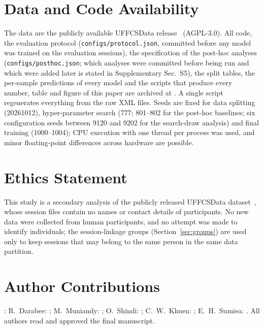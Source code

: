 \section*{Data and Code Availability}
The data are the publicly available UFFCSData release~\cite{porcino2019uffcsdata} (AGPL-3.0). All code, the evaluation protocol (\texttt{configs/\allowbreak protocol.json}, committed before any model was trained on the evaluation sessions), the specification of the post-hoc analyses (\texttt{configs/\allowbreak posthoc.json}; which analyses were committed before being run and which were added later is stated in Supplementary Sec.~S5), the split tables, the per-sample predictions of every model and the scripts that produce every number, table and figure of this paper are archived at . A single script regenerates everything from the raw XML files. Seeds are fixed for data splitting (20261012), hyper-parameter search (777; 801--802 for the post-hoc baselines; six configuration seeds between 9120 and 9202 for the search-draw analysis) and final training (1000--1004); CPU execution with one thread per process was used, and minor floating-point differences across hardware are possible.

\section*{Ethics Statement}
This study is a secondary analysis of the publicly released UFFCSData dataset~\cite{porcino2019uffcsdata}, whose session files contain no names or contact details of participants. No new data were collected from human participants, and no attempt was made to identify individuals; the session-linkage groups (Section~\ref{sec:groups}) are used only to keep sessions that may belong to the same person in the same data partition. 

\section*{Author Contributions}
: R.~Darabee: ; M.~Muniandy: ; O.~Shindi: ; C.~W.~Khuen: ; E.~H.~Sumiea: . All authors read and approved the final manuscript.

